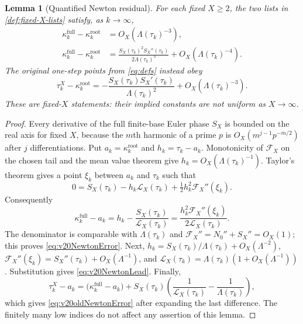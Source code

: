 \documentclass[11pt,reqno]{amsart}
\numberwithin{equation}{section}
\newtheorem{lemma}[theorem]{Lemma}
\begin{document}
\begin{lemma}[Quantified Newton residual]\label{lem:v20NewtonResidual}
For each fixed $X\ge2$, the two lists in
\cref{def:fixed-X-lists} satisfy, as $k\to\infty$,
\begin{align}
\kappa_k^{\mathrm{full}}-\kappa_k^{\mathrm{root}}
 &=O_X(\Lambda(\tau_k)^{-3}),\label{eq:v20NewtonError}\\
\kappa_k^{\mathrm{full}}-\kappa_k^{\mathrm{root}}
 &=\frac{S_X(\tau_k)^2S_X''(\tau_k)}{2\Lambda(\tau_k)^3}
 +O_X(\Lambda(\tau_k)^{-4}).\label{eq:v20NewtonLead}
\end{align}
The original one-step points from \eqref{eq:defs} instead obey
\begin{equation}\label{eq:v20oldNewtonError}
\tau_k^X-\kappa_k^{\mathrm{root}}
 =-\frac{S_X(\tau_k)S_X'(\tau_k)}{\Lambda(\tau_k)^2}
 +O_X(\Lambda(\tau_k)^{-3}).
\end{equation}
These are fixed-$X$ statements: their implied constants are not
uniform as $X\to\infty$.
\end{lemma}
\begin{proof}
Every derivative of the full finite-base Euler phase $S_X$ is
bounded on the real axis for fixed $X$, because the $m$th
harmonic of a prime $p$ is $O_X(m^{j-1}p^{-m/2})$ after
$j$ differentiations.  Put $a_k=\kappa_k^{\mathrm{root}}$
and $h_k=\tau_k-a_k$.  Monotonicity of $\mathcal F_X$ on the
chosen tail and the mean value theorem give
$h_k=O_X(\Lambda(\tau_k)^{-1})$.  Taylor's theorem gives a
point $\xi_k$ between $a_k$ and $\tau_k$ such that
\[
0=S_X(\tau_k)-h_k\mathcal L_X(\tau_k)
  +\tfrac12h_k^2\mathcal F_X''(\xi_k).
\]
Consequently
\[
\kappa_k^{\mathrm{full}}-a_k
=h_k-\frac{S_X(\tau_k)}{\mathcal L_X(\tau_k)}
=\frac{h_k^2\mathcal F_X''(\xi_k)}{2\mathcal L_X(\tau_k)}.
\]
The denominator is comparable with $\Lambda(\tau_k)$ and
$\mathcal F_X''=N_0''+S_X''=O_X(1)$; this proves
\eqref{eq:v20NewtonError}.  Next,
$h_k=S_X(\tau_k)/\Lambda(\tau_k)+O_X(\Lambda^{-2})$,
$\mathcal F_X''(\xi_k)=S_X''(\tau_k)+O_X(\Lambda^{-1})$,
and $\mathcal L_X(\tau_k)=\Lambda(\tau_k)(1+O_X(\Lambda^{-1}))$.
Substitution gives \eqref{eq:v20NewtonLead}.
Finally,
\[
\tau_k^X-a_k
=\bigl(\kappa_k^{\mathrm{full}}-a_k\bigr)
 +S_X(\tau_k)\left(\frac1{\mathcal L_X(\tau_k)}
                       -\frac1{\Lambda(\tau_k)}\right),
\]
which gives \eqref{eq:v20oldNewtonError} after expanding the
last difference.  The finitely many low indices do not affect any
assertion of this lemma.
\end{proof}
\end{document}
